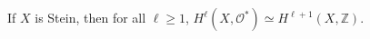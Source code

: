 If $X$ is Stein, then for all $\ell \geqslant 1$, $H^\ell(X, \mathcal{O}^*) \simeq H^{\ell+1}(X, \mathbb{Z})$.
